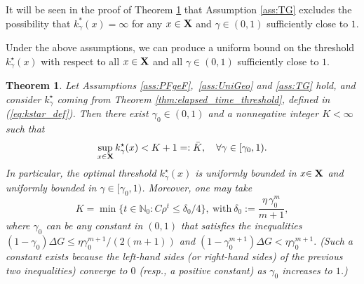 \documentclass[letterpaper,10pt,conference]{ieeeconf}  %
\newtheorem{theorem}{Theorem}
\begin{document}
{It will be seen in the proof of Theorem \ref{thm:uni_bound_threshold} that Assumption \ref{ass:TG} excludes the possibility that $k_\gamma^\ast(x)=\infty$ for any $x\in {\bf X}$ and $\gamma\in (0,1)$ sufficiently close to $1$.} 


Under the above assumptions, we can produce a uniform bound on the threshold {$k_\gamma^\star(x)$ with respect to all $x\in {\bf X}$ and all $\gamma\in (0,1)$ sufficiently close to $1$.}
\medskip
\begin{theorem}
\label{thm:uni_bound_threshold}
Let {Assumptions \ref{ass:PFgeF},~\ref{ass:UniGeo} and \ref{ass:TG} hold, and consider $k_\gamma^\star$ coming from Theorem \ref{thm:elapsed_time_threshold}, defined in (\ref{eq:kstar_def}).}
Then there exist $\gamma_0\in(0,1)$ and a {nonnegative} integer $K<\infty$ such that  
\begin{equation}\label{eq:uniform_bound_conclusion}
\sup_{x\in {\bf X}} {k^\star_\gamma}(x)< {K+1 =: \bar{K}}, \quad {\forall \gamma\in[\gamma_0,1)}.
\end{equation}
In particular, the optimal threshold {$k_\gamma^\star(x)$} is uniformly bounded in $x{\in{\bf X}}$ and 
  uniformly bounded in $\gamma{\in [\gamma_0,1)}$.
\medskip
Moreover, one may take
\begin{equation}\label{eq:delta0_def}
K=\min\Big\{t\in\mathbb N_0: C\rho^{t}\le \delta_0/4\Big\},
\ \mbox{with} \
\delta_0:=\frac{\eta\,\gamma_0^{m}}{m+1},
\end{equation}
where $\gamma_0$ {can be any constant in $(0,1)$ that} satisfies the {inequalities} 
$(1-\gamma_0)\Delta G\le \eta\gamma_0^{m+1}/(2(m+1))$ {and 
$(1-\gamma_0^{m+1})\Delta G <\eta \gamma_0^{m+1}.$ (Such a constant exists because the left-hand sides (or right-hand sides) of the previous two inequalities) converge to $0$ (resp., a positive constant) as $\gamma_0$ increases to $1$.)} 
\end{theorem}
\medskip
\end{document}
